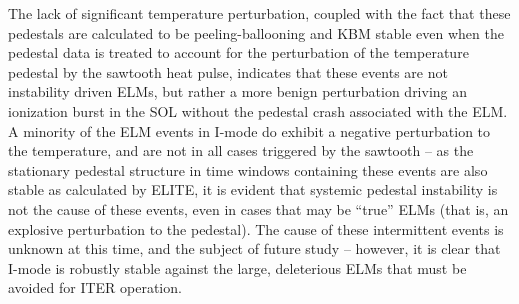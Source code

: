 \documentclass[ twoside,openright,titlepage,numbers=noenddot,headinclude,%
                footinclude=true,cleardoublepage=empty,abstractoff, %
                BCOR=5mm,paper=letter,fontsize=11pt,%
                ngerman,american,%
                ]{scrreprt}
\begin{document}
\begin{figure}[h]
 \pushtooutside
\end{figure}

\noindent The lack of significant temperature perturbation, coupled with the fact that these pedestals are calculated to be peeling-ballooning and KBM stable even when the pedestal data is treated to account for the perturbation of the temperature pedestal by the sawtooth heat pulse, indicates that these events are not instability driven ELMs, but rather a more benign perturbation driving an ionization burst in the SOL without the pedestal crash associated with the ELM.  A minority of the ELM events in  I-mode do exhibit a negative perturbation to the temperature, and are not in all cases triggered by the sawtooth -- as the stationary pedestal structure in time windows containing these events are also stable as calculated by ELITE, it is evident that systemic pedestal instability is not the cause of these events, even in cases that may be ``true'' ELMs (that is, an explosive perturbation to the pedestal).  The cause of these intermittent events is unknown at this time, and the subject of future study -- however, it is clear that I-mode is robustly stable against the large, deleterious ELMs that must be avoided for ITER operation.
\end{document}

